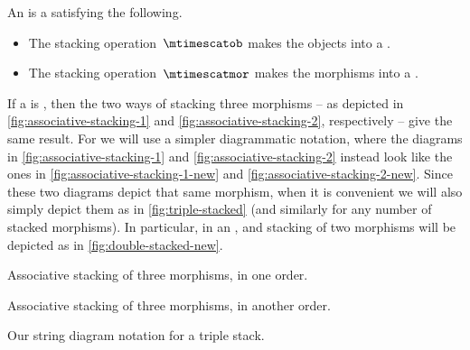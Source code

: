 \begin{ctdefinition}
    \label{def:stacking-semi-cat}
    An  is a  satisfying the following.

    \condit
    \begin{itemize}
        \item The stacking operation~$\mtimescatob$ makes the objects into a .
        \item The stacking operation~$\mtimescatmor$ makes the morphisms into a .
    \end{itemize}
\end{ctdefinition}

If a  is , then the two ways of stacking three morphisms -- as depicted in \cref{fig:associative-stacking-1} and \cref{fig:associative-stacking-2}, respectively -- give the same result.
For   we will use a simpler diagrammatic notation, where the diagrams in \cref{fig:associative-stacking-1} and \cref{fig:associative-stacking-2} instead look like the ones in \cref{fig:associative-stacking-1-new} and \cref{fig:associative-stacking-2-new}.
Since these two diagrams depict that same morphism, when it is convenient we will also simply depict them as in \cref{fig:triple-stacked} (and similarly for any number of stacked morphisms).
In particular, in an  , and stacking of two morphisms will be depicted as in \cref{fig:double-stacked-new}.

\begin{marginfigure}[]
    \centering
    \caption{Associative stacking of three morphisms, in one order.}
    \label{fig:associative-stacking-1-new}
\end{marginfigure}

\begin{marginfigure}
    \centering
    \caption{Associative stacking of three morphisms, in another order.}
    \label{fig:associative-stacking-2-new}
\end{marginfigure}

\begin{marginfigure}
    \centering
    \caption{Our string diagram notation for a triple stack.}
    \label{fig:triple-stacked}
\end{marginfigure}

